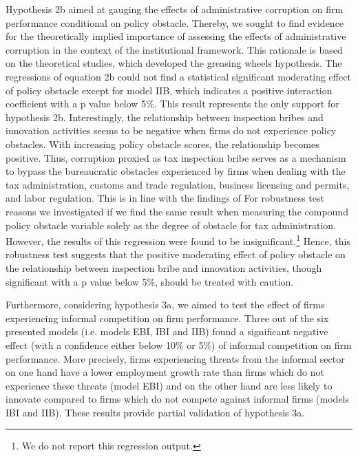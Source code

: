 Hypothesis 2b aimed at gauging the effects of administrative corruption on firm performance conditional on policy obstacle. Thereby, we sought to find evidence for the theoretically implied importance of assessing the effects of administrative corruption in the context of the institutional framework. This rationale is based on the theoretical studies, which developed the greasing wheels hypothesis. The regressions of equation 2b could not find a statistical significant moderating effect of policy obstacle except for model IIB, which indicates a positive interaction coefficient with a p value below 5\%. This result represents the only support for hypothesis 2b. Interestingly, the relationship between inspection bribes and innovation activities seems to be negative when firms do not experience policy obstacles. With increasing policy obstacle scores, the relationship becomes positive. Thus, corruption proxied as tax inspection bribe serves as a mechanism to bypass the bureaucratic obstacles experienced by firms when dealing with the tax administration, customs and trade regulation, business licensing and permits, and labor regulation. This is in line with the findings of \citet{goedhuys2016corruption} For robustness test reasons we investigated if we find the same result when measuring the compound policy obstacle variable solely as the degree of obstacle for tax administration. However, the results of this regression were found to be insignificant.\footnote{We do not report this regression output.} Hence, this robustness test suggests that the positive moderating effect of policy obstacle on the relationship between inspection bribe and innovation activities, though significant with a p value below 5\%, should be treated with caution. 

Furthermore, considering hypothesis 3a, we aimed to test the effect of firms experiencing informal competition on firm performance. Three out of the six presented models (i.e. models EBI, IBI and IIB) found a significant negative effect (with a confidence either below 10\% or 5\%) of informal competition on firm performance. More precisely, firms experiencing threats from the informal sector on one hand have a lower employment growth rate than firms which do not experience these threats (model EBI) and on the other hand are less likely to innovate compared to firms which do not compete against informal firms (models IBI and IIB). These results provide partial validation of hypothesis 3a. 

